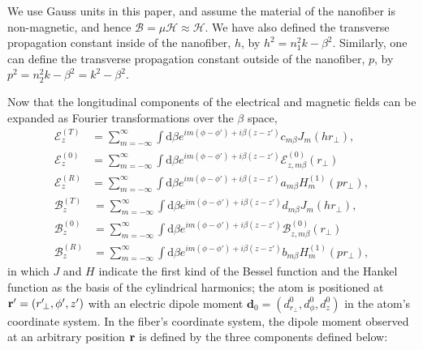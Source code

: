 \documentclass[preprint,aps,pra,onecolumn]{revtex4-1} %
\begin{document}
We use Gauss units in this paper, and assume the material of the nanofiber is non-magnetic, and hence $ 
\boldsymbol{\mathcal{B}}= \mu\boldsymbol{\mathcal{H}}\approx \boldsymbol{\mathcal{H}} $. We have also defined the transverse propagation constant inside of the nanofiber, $ h $, by $h^2=n_1^2k-\beta^2$. Similarly, one can define the transverse propagation constant outside of the nanofiber, $ p $, by $ p^2=n_2^2k-\beta^2=k^2-\beta^2 $.

Now that the longitudinal components of the electrical and magnetic fields can be expanded as Fourier transformations over the $ \beta $ space,
\begin{subequations}\label{ET0Rexpand}
\begin{align}
\mathcal{E}^{(T)}_z
&= \sum_{m=-\infty}^\infty \int \mathrm{d}\beta e^{im(\phi-\phi') + i\beta (z-z')} c_{m\beta} J_m (hr\!_\perp),\\
\mathcal{E}^{(0)}_{z} &= \sum_{m=-\infty}^\infty \int \mathrm{d}\beta e^{im(\phi-\phi') + i\beta (z-z')} \mathcal{E}^{(0)}_{z,m\beta}(r\!_\perp)\\
\mathcal{E}^{(R)}_z 
&= \sum_{m=-\infty}^\infty \int \mathrm{d}\beta e^{im(\phi-\phi') + i\beta (z-z')} a_{m\beta} H_m^{(1)} (pr\!_\perp),
\end{align}
\end{subequations}
\begin{subequations}\label{BT0Rexpand}
\begin{align}
\mathcal{B}^{(T)}_z 
&= \sum_{m=-\infty}^\infty \int \mathrm{d}\beta e^{im(\phi-\phi') + i\beta (z-z')} d_{m\beta} J_m (hr\!_\perp),\\
\mathcal{B}^{(0)}_{z} &= \sum_{m=-\infty}^\infty \int \mathrm{d}\beta e^{im(\phi-\phi') + i\beta (z-z')} \mathcal{B}^{(0)}_{z,m\beta}(r\!_\perp)\\
\mathcal{B}^{(R)}_z 
&= \sum_{m=-\infty}^\infty \int \mathrm{d}\beta e^{im(\phi-\phi') + i\beta (z-z')} b_{m\beta} H_m^{(1)} (pr\!_\perp),
\end{align}
\end{subequations}
in which $J$ and $H$ indicate the first kind of the Bessel function and the Hankel function as the basis of the cylindrical harmonics; the atom is positioned at $\mathbf{r}'=(r^\prime\!_\perp,\phi',z')$ with an electric dipole moment $\mathbf{d}_0=(d^0_{r\!_\perp}, d^0_\phi,d^0_z)$ in the atom's coordinate system. In the fiber's coordinate system, the dipole moment observed at an arbitrary position $\mathbf{r}$ is defined by the three components defined below:
\end{document}
